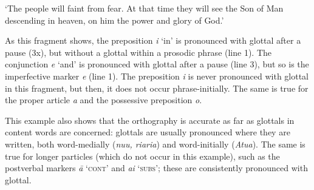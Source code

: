 \glt
‘The people will faint from fear. At that time they will see the Son of Man descending in heaven, on him the power and glory of God.’ \textstyleExampleref{[R630-13.010]}
\z

As this fragment shows, the preposition \textit{{\ꞌ}i} ‘in’ is pronounced with glottal after a pause (3x), but without a glottal within a prosodic phrase (line 1). The conjunction \textit{{\ꞌ}e} ‘and’ is pronounced with glottal after a pause (line 3), but so is the imperfective marker \textit{e} (line 1). The preposition \textit{i} is never pronounced with glottal in this fragment, but then, it does not occur phrase-initially. The same is true for the proper article \textit{a} and the possessive preposition \textit{o}.

This example also shows that the orthography is accurate as far as glottals in content words are concerned: glottals are usually pronounced where they are written, both word-medially (\textit{nu{\ꞌ}u, ri{\ꞌ}ari{\ꞌ}a}) and word-initially (\textit{{\ꞌ}Atua}). The same is true for longer particles (which do not occur in this example), such as the postverbal markers \textit{{\ꞌ}ā} ‘\textsc{cont}’ and \textit{{\ꞌ}ai} ‘\textsc{subs}’; these are consistently pronounced with glottal.

